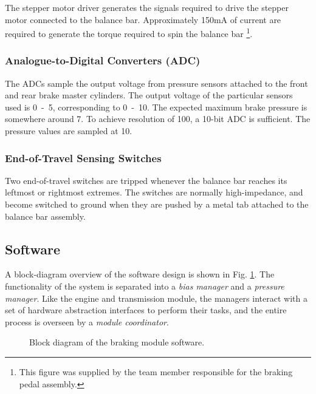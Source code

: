 The stepper motor driver generates the signals required to drive the stepper motor connected to the balance bar. Approximately \unit{150}{mA} of current are required to generate the torque required to spin the balance bar \footnote{This figure was supplied by the team member responsible for the braking pedal assembly.}.

\subsubsection{Analogue-to-Digital Converters (ADC)}

The ADCs sample the output voltage from pressure sensors attached to the front and rear brake master cylinders. The output voltage of the particular sensors used is \unit{0-5}{\volt}, corresponding to \unit{0-10}{\mega\pascal}. The expected maximum brake pressure is somewhere around \unit{7}{\mega\pascal}. To achieve resolution of \unit{100}{\kilo\pascal}, a 10-bit ADC is sufficient. The pressure values are sampled at \unit{10}{\hertz}.

\subsubsection{End-of-Travel Sensing Switches}

Two end-of-travel switches are tripped whenever the balance bar reaches its leftmost or rightmost extremes. The switches are normally high-impedance, and become switched to ground when they are pushed by a metal tab attached to the balance bar assembly. 

\subsection{Software}

A block-diagram overview of the software design is shown in Fig. \ref{fig:brake_software_design_block}. The functionality of the system is separated into a \emph{bias manager} and a \emph{pressure manager}. Like the engine and transmission module, the managers interact with a set of hardware abstraction interfaces to perform their tasks, and the entire process is overseen by a \emph{module coordinator}.

\begin{figure}[H]
	\centering
	
	\caption{Block diagram of the braking module software.}
	\label{fig:brake_software_design_block}
\end{figure}

